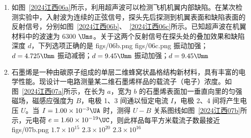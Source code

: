 \documentclass[\gkver]{gaokaozhenti}
\begin{document}
\begin{enumerate}
\item
如图~\ref{2024江西06a}所示，利用超声波可以检测飞机机翼内部缺陷。在某次检测实验中，入射波为连续的正弦信号，探头先后探测到机翼表面和缺陷表面的反射信号，分别如图~\ref{2024江西06b}、~\ref{2024江西06c}所示。已知超声波在机翼材料中的波速为 6300 $\Ums$。关于这两个反射信号在探头处的叠加效果和缺陷深度 $d$，下列选项正确的是
{figs/06b.png}
{figs/06c.png}
{振动加强；$d = 4.725 \Umm$}
{振动减弱；$d = 9.45 \Umm$}
{振动加强；$d = 9.45 \Umm$}

\item
石墨烯是一种由碳原子组成的单层二维蜂窝状晶格结构新材料，具有丰富的电学性能。现设计一电路测量某二维石墨烯样品的载流子（电子）浓度。如图~\ref{2024江西07a}所示，在长为 $a$，宽为 $b$ 的石墨烯表面加一垂直向里的匀强磁场，磁感应强度为 $B$，电极 1、3 间通以恒定电流 $I$，电极 2、4 间将产生电压 $U$。当 $I = 1.00\times10^{-3} \UA$ 时，测得 $U - B$ 关系图线如图~\ref{2024江西07b}所示，元电荷 $e = 1.60\times10^{-19} \UC$，则此样品每平方米载流子数最接近
{figs/07b.png}
{$1.7\times10^{15}$}
{$2.3\times10^{20}$}
{$2.3\times10^{16}$}
\end{enumerate}
\end{document}
